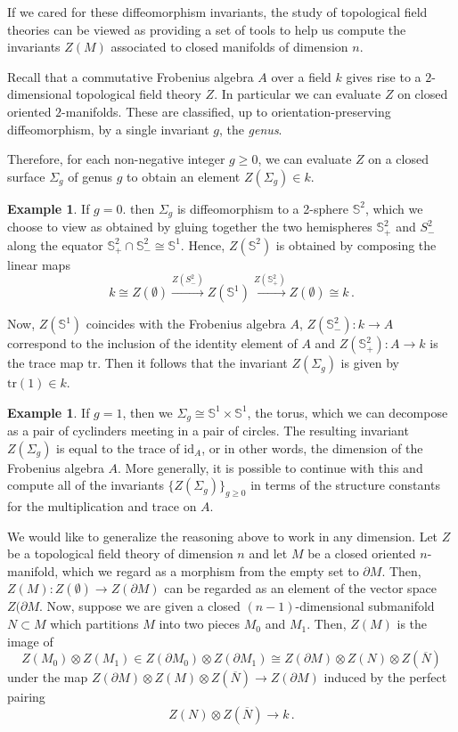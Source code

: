 \documentclass[a4paper,11pt]{article}
\newcommand{\ide}{\mathrm{id}}
\theoremstyle{plain}
\theoremstyle{definition}
\newtheorem{ej}[thm]{Example}
\theoremstyle{remark}
\begin{document}
If we cared for these diffeomorphism invariants, the study of topological field theories can be viewed as providing a set of tools to help us compute the invariants $Z(M)$ associated to closed manifolds of dimension $n$. 


Recall that a commutative Frobenius algebra $A$ over a field $k$ gives rise to a $2$-dimensional topological field theory $Z$. In particular we can evaluate $Z$ on closed oriented $2$-manifolds. These are classified, up to orientation-preserving diffeomorphism, by a single invariant $g$, the \textit{genus}.

Therefore, for each non-negative integer $g \geq 0$, we can evaluate $Z$ on a closed surface $\Sigma_g$ of genus $g$ to obtain an element $Z(\Sigma_g) \in k$. 

\begin{ej}
If $g = 0$. then $\Sigma_g$ is diffeomorphism to a 2-sphere $\mathbb{S}^2$, which we choose to view as obtained by gluing together the two hemispheres $\mathbb{S}^2_+$ and $S^2_-$ along the equator $\mathbb{S}^2_+ \cap \mathbb{S}^2_- \cong \mathbb{S}^1$. Hence, $Z(\mathbb{S}^2)$ is obtained by composing the linear maps 
$$k \cong Z(\emptyset) \xrightarrow{Z(S^2_-)} Z(\mathbb{S}^1) \xrightarrow{Z(\mathbb{S}^2_+)} Z(\emptyset) \cong k \, .$$

Now, $Z(\mathbb{S}^1)$ coincides with the Frobenius algebra $A$, $Z(\mathbb{S}_-^2) \colon k \to A$ correspond to the inclusion of the identity element of $A$ and $Z(\mathbb{S}^2_+) \colon A \to k$ is the trace map $\text{tr}$. Then it follows that the invariant $Z(\Sigma_g)$ is given by $\text{tr}(1) \in k$.
\end{ej}

\begin{ej}
If $g = 1$, then we $\Sigma_g \cong \mathbb{S}^1 \times \mathbb{S}^1$, the torus, which we can decompose as a pair of cyclinders meeting in a pair of circles. The resulting invariant $Z(\Sigma_g)$ is equal to the trace of $\ide_A$, or in other words, the dimension of the Frobenius algebra $A$. More generally, it is possible to continue with this and compute all of the invariants $\{Z(\Sigma_g)\}_{g \geq 0}$ in terms of the structure constants for the multiplication and trace on $A$.
\end{ej}

We would like to generalize the reasoning above to work in any dimension. Let $Z$ be a topological field theory of dimension $n$ and let $M$ be a closed oriented $n$-manifold, which we regard as a morphism from the empty set to $\partial M$. Then, $Z(M) \colon Z(\emptyset) \to Z(\partial M)$ can be regarded as an element of the vector space $Z(\partial M$. Now, suppose we are given a closed $(n-1)$-dimensional submanifold $N \subset M$ which partitions $M$ into two pieces $M_0$ and $M_1$. Then, $Z(M)$ is the image of 
$$Z(M_0) \otimes Z(M_1) \in Z(\partial M_0) \otimes Z(\partial M_1) \cong Z(\partial M) \otimes Z(N) \otimes Z(\overline{N})$$
under the map $Z(\partial M) \otimes Z(M) \otimes Z(\overline{N}) \to Z(\partial M)$ induced by the perfect pairing 
$$Z(N) \otimes Z(\overline{N}) \to k \, .$$
\end{document}

